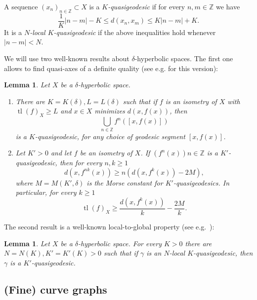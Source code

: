 \documentclass{amsart}
\newcommand{\Z}{\mathbb{Z}}
\newcommand{\tl}[1]{\operatorname{tl}(#1)}
\newcommand{\dist}{d}
\newtheorem{lemma}[thm]{Lemma}
\theoremstyle{definition}
\begin{document}
A sequence \((x_n)_{n\in\Z}\subset X\) is a \emph{\(K\)-quasigeodesic} if for every \(n,m\in\Z\) we have
\[\frac{1}{K}|n-m|-K\leq \dist(x_n,x_m)\leq K|n-m|+K.\]
It is a \emph{\(N\)-local \(K\)-quasigeodesic} if the above inequalities hold whenever \(|n-m|<N\).

We will use two well-known results about \(\delta\)-hyperbolic
spaces. The first one allows to find quasi-axes of a definite quality
(see e.g. \cite[Lemma 3.6]{hlr_rotation} for this version):
\begin{lemma}\label{lem:quasigeods}
Let \(X\) be a \(\delta\)-hyperbolic space.
\begin{enumerate}
    \item There are \(K=K(\delta), L=L(\delta)\) such that if \(f\) is an isometry of \(X\) with \(\tl{f}_X\geq L\) and \(x\in X\) minimizes \(\dist(x,f(x))\), then \[\bigcup_{n\in\Z}f^n([x,f(x)])\]
    is a \(K\)-quasigeodesic, for any choice of geodesic segment \([x,f(x)]\).
    \item Let \(K'>0\) and let \(f\) be an isometry of \(X\). If \((f^n(x)){n\in\Z}\) is a \(K'\)-quasigeodesic, then for every \(n,k\geq 1\)
    \[d(x,f^{nk}(x))\geq n(\dist(x,f^k(x))-2M),\]
    where \(M=M(K',\delta)\) is the Morse constant for \(K'\)-quasigeodesics. In particular, for every \(k\geq 1\)
    \[\tl{f}_X\geq \frac{d(x,f^k(x))}{k}-\frac{2M}{k}.\]
\end{enumerate}
\end{lemma}

The second result is a well-known local-to-global property (see e.g.\ \cite[Théorème 1.4, Chapitre 3]{cdp_geometrie}):

\begin{lemma}\label{lem:local-to-global}
Let \(X\) be a \(\delta\)-hyperbolic space. For every \(K>0\) there are \(N=N(K),K'=K'(K)>0\) such that if \(\gamma\) is an \(N\)-local \(K\)-quasigeodesic, then \(\gamma\) is a \(K'\)-quasigeodesic.
\end{lemma}

\subsection*{(Fine) curve graphs}
\end{document}
